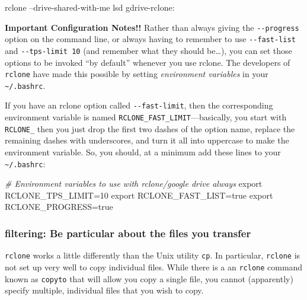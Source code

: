 \documentclass[]{krantz}
\makeatletter
\newenvironment{Shaded}{\begin{snugshade}}{\end{snugshade}}
\newcommand{\BuiltInTok}[1]{#1}
\newcommand{\CommentTok}[1]{\textcolor[rgb]{0.37,0.37,0.37}{\textit{#1}}}
\newcommand{\ExtensionTok}[1]{#1}
\newcommand{\NormalTok}[1]{#1}
\newcommand{\VariableTok}[1]{\textcolor[rgb]{0,0,0}{#1}}
\newenvironment{kframe}{%
\medskip{}
\setlength{\fboxsep}{.8em}
 \def\at@end@of@kframe{}%
 \ifinner\ifhmode%
  \def\at@end@of@kframe{\end{minipage}}%
  \begin{minipage}{\columnwidth}%
 \fi\fi%
 \def\FrameCommand##1{\hskip\@totalleftmargin \hskip-\fboxsep
 \colorbox{shadecolor}{##1}\hskip-\fboxsep
     \hskip-\linewidth \hskip-\@totalleftmargin \hskip\columnwidth}%
 \MakeFramed {\advance\hsize-\width
   \@totalleftmargin\z@ \linewidth\hsize
   \@setminipage}}%
 {\par\unskip\endMakeFramed%
 \at@end@of@kframe}
\renewenvironment{Shaded}{\begin{kframe}}{\end{kframe}}
\makeatother
\begin{document}
\begin{Shaded}
\begin{Highlighting}[]
\ExtensionTok{rclone}\NormalTok{ --drive-shared-with-me lsd gdrive-rclone:}
\end{Highlighting}
\end{Shaded}

\textbf{Important Configuration Notes!!} Rather than always giving the \texttt{-\/-progress}
option on the command line, or always having to remember to use
\texttt{-\/-fast-list} and \texttt{-\/-tps-limit\ 10} (and remember what they should be\ldots{}),
you can set those options to be invoked ``by default'' whenever you use
rclone. The developers of \texttt{rclone} have made this possible
by setting \emph{environment variables} in your \texttt{\textasciitilde{}/.bashrc}.

If you have an rclone option called \texttt{-\/-fast-limit}, then the corresponding
environment variable is named \texttt{RCLONE\_FAST\_LIMIT}---basically, you
start with \texttt{RCLONE\_} then you just
drop the first two dashes of the option name, replace the remaining dashes
with underscores, and turn it all into uppercase to make the
environment variable. So, you should, at a minimum add these
lines to your \texttt{\textasciitilde{}/.bashrc}:

\begin{Shaded}
\begin{Highlighting}[]
\CommentTok{# Environment variables to use with rclone/google drive always}
\BuiltInTok{export} \VariableTok{RCLONE_TPS_LIMIT=}\NormalTok{10}
\BuiltInTok{export} \VariableTok{RCLONE_FAST_LIST=}\NormalTok{true}
\BuiltInTok{export} \VariableTok{RCLONE_PROGRESS=}\NormalTok{true}
\end{Highlighting}
\end{Shaded}

\hypertarget{rclone-filter}{%
\subsubsection{filtering: Be particular about the files you transfer}\label{rclone-filter}}

\texttt{rclone} works a little differently than the Unix utility \texttt{cp}. In particular,
\texttt{rclone} is not set up very well to copy individual files. While there is a
an \texttt{rclone} command known as \texttt{copyto} that will allow you copy a single file,
you cannot (apparently) specify multiple, individual files that you wish to copy.
\end{document}
